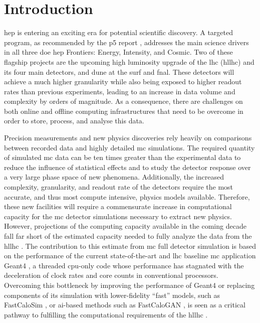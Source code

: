 \section{Introduction}

\ac{hep} is entering an exciting era for potential scientific discovery. A
targeted program, as recommended by the \ac{p5} report
\cite{ritz_building_2014}, addresses the main science drivers in all three
\ac{doe} \ac{hep} Frontiers: Energy, Intensity, and Cosmic. Two of these
flagship projects are the upcoming high luminosity upgrade of the \acl{lhc}
(\acs{hllhc}) and its four main detectors, and \ac{dune} at the \ac{surf} and
\ac{fnal}. These detectors will achieve a much higher granularity while also
being exposed to higher readout rates than previous experiments, leading to an
increase in data volume and complexity by orders of magnitude. As a consequence,
there are challenges on both online and offline computing infrastructures that
need to be overcome in order to store, process, and analyse this data.

Precision measurements and new physics discoveries rely heavily on comparisons
between recorded data and highly detailed \ac{mc} simulations. The required
quantity of simulated \ac{mc} data can be ten times greater than the
experimental data to reduce the influence of statistical effects and to study
the detector response over a very large phase space of new phenomena.
Additionally, the increased complexity, granularity, and readout rate of the
detectors require the most accurate, and thus most compute intensive, physics
models available. Therefore, these new facilities will require a commensurate
increase in computational capacity for the \ac{mc} detector simulations
necessary to extract new physics. However, projections of the computing capacity
available in the coming decade fall far short of the estimated capacity needed
to fully analyze the data from the \acs{hllhc}
\cite{the_atlas_collaboration_atlas_2020,cms-offline-computing-results}. The
contribution to this estimate from \ac{mc} full detector simulation is based on
the performance of the current state-of-the-art and \acs{lhc} baseline \ac{mc}
application Geant4 \cite{geant4_status_2016}, a threaded \acs{cpu}-only code
whose performance has stagnated with the deceleration of clock rates and core
counts in conventional processors. Overcoming this bottleneck by improving the
performance of Geant4 or replacing components of its simulation with
lower-fidelity ``fast'' models, such as FastCaloSim \cite{fastcalosim}, or
\ac{ai}-based methods such as FastCaloGAN \cite{fastcalogan}, is seen as a
critical pathway to fulfilling the computational requirements of the \acs{hllhc}
\cite{the_hep_software_foundation_roadmap_2019}.

